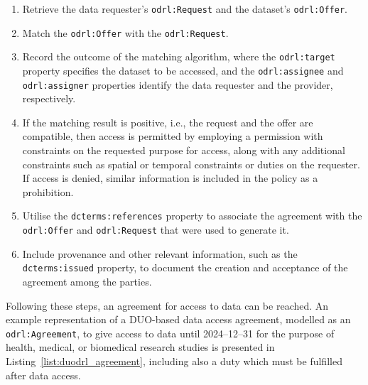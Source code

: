 \begin{enumerate}
    \item Retrieve the data requester's \texttt{odrl:Request} and the dataset's \texttt{odrl:Offer}.
    \item Match the \texttt{odrl:Offer} with the \texttt{odrl:Request}.
    \item Record the outcome of the matching algorithm, where the \texttt{odrl:target} property specifies the dataset to be accessed, and the \texttt{odrl:assignee} and \texttt{odrl:assigner} properties identify the data requester and the provider, respectively.
    \item If the matching result is positive, i.e., the request and the offer are compatible, then access is permitted by employing a permission with constraints on the requested purpose for access, along with any additional constraints such as spatial or temporal constraints or duties on the requester. If access is denied, similar information is included in the policy as a prohibition.
    \item Utilise the \texttt{dcterms:references} property to associate the agreement with the \texttt{odrl:Offer} and \texttt{odrl:Request} that were used to generate it.
    \item Include provenance and other relevant information, such as the \texttt{dcterms:issued} property, to document the creation and acceptance of the agreement among the parties.
\end{enumerate}

Following these steps, an agreement for access to data can be reached.
An example representation of a DUO-based data access agreement, modelled as an \texttt{odrl:Agreement}, to give access to data until 2024--12--31 for the purpose of health, medical, or biomedical research studies is presented in Listing~\ref{list:duodrl_agreement}, including also a duty which must be fulfilled after data access.

